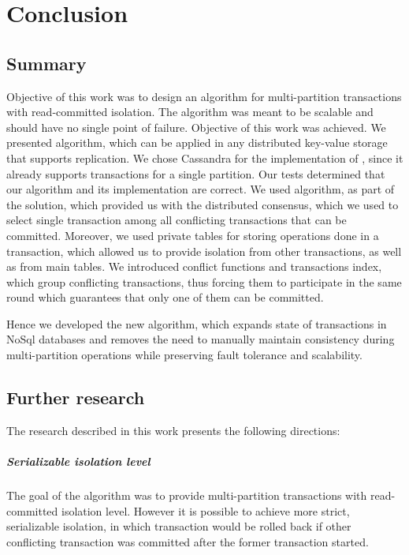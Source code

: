 
\chapter{Conclusion}\label{chapter:summary}

\section{Summary}
Objective of this work was to design an algorithm for multi-partition transactions with read-committed isolation. The algorithm was meant to be scalable and should have no single point of failure. Objective of this work was achieved. We presented \mpt algorithm, which can be applied in any distributed key-value storage that supports replication.
We chose Cassandra for the implementation of \mpt, since it already supports transactions for a single partition. Our tests determined that our algorithm and its implementation are correct. We used \paxos algorithm, as part of the solution, which provided us with the distributed consensus, which we used to select single transaction among all conflicting transactions that can be committed. Moreover, we used private tables for storing operations done in a  transaction, which allowed us to provide isolation from other transactions, as well as from main tables. We introduced conflict functions and transactions index, which group conflicting transactions, thus forcing them to participate in the same \paxos round which guarantees that only one of them can be committed.

Hence we developed the new algorithm, which expands state of transactions in NoSql databases and 
removes the need to manually maintain consistency during multi-partition operations 
while preserving fault tolerance and scalability. 


\section{Further research}
The research described in this work presents the following directions:

\paragraph{Serializable isolation level}
The goal of the algorithm was to provide multi-partition transactions with read-committed isolation level. However it is possible to achieve more strict, serializable isolation, in which transaction would be rolled back if other conflicting transaction was committed after the former transaction started. 

